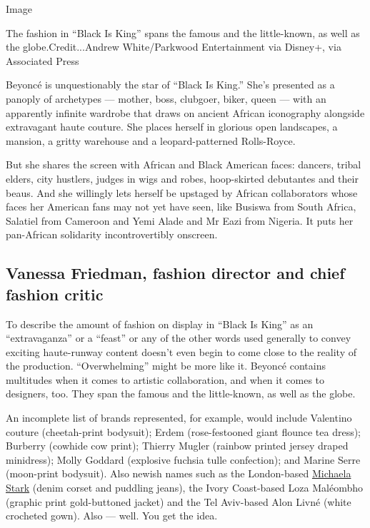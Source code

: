 Image

The fashion in ``Black Is King'' spans the famous and the little-known,
as well as the globe.Credit...Andrew White/Parkwood Entertainment via
Disney+, via Associated Press

Beyoncé is unquestionably the star of ``Black Is King.'' She's presented
as a panoply of archetypes --- mother, boss, clubgoer, biker, queen ---
with an apparently infinite wardrobe that draws on ancient African
iconography alongside extravagant haute couture. She places herself in
glorious open landscapes, a mansion, a gritty warehouse and a
leopard-patterned Rolls-Royce.

But she shares the screen with African and Black American faces:
dancers, tribal elders, city hustlers, judges in wigs and robes,
hoop-skirted debutantes and their beaus. And she willingly lets herself
be upstaged by African collaborators whose faces her American fans may
not yet have seen, like Busiswa from South Africa, Salatiel from
Cameroon and Yemi Alade and Mr Eazi from Nigeria. It puts her
pan-African solidarity incontrovertibly onscreen.

\hypertarget{vanessa-friedman-fashion-director-and-chief-fashion-critic}{%
\subsection{Vanessa Friedman, fashion director and chief fashion
critic}\label{vanessa-friedman-fashion-director-and-chief-fashion-critic}}

To describe the amount of fashion on display in ``Black Is King'' as an
``extravaganza'' or a ``feast'' or any of the other words used generally
to convey exciting haute-runway content doesn't even begin to come close
to the reality of the production. ``Overwhelming'' might be more like
it. Beyoncé contains multitudes when it comes to artistic collaboration,
and when it comes to designers, too. They span the famous and the
little-known, as well as the globe.

An incomplete list of brands represented, for example, would include
Valentino couture (cheetah-print bodysuit); Erdem (rose-festooned giant
flounce tea dress); Burberry (cowhide cow print); Thierry Mugler
(rainbow printed jersey draped minidress); Molly Goddard (explosive
fuchsia tulle confection); and Marine Serre (moon-print bodysuit). Also
newish names such as the London-based
\href{https://www.instagram.com/p/CDTR8fsA1Y_/}{Michaela Stark} (denim
corset and puddling jeans), the Ivory Coast-based Loza Maléombho
(graphic print gold-buttoned jacket) and the Tel Aviv-based Alon Livné
(white crocheted gown). Also --- well. You get the idea.

